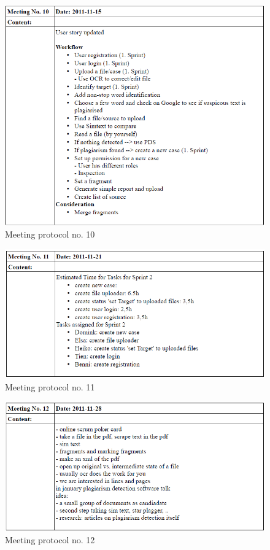 \begin{appendix}
\begin{figure}
  \centering
    \includegraphics[width=\textwidth]{images/a_meetings/meeting_10.png}
  \caption{Meeting protocol no. 10}
  \label{fig:meeting protocol no. 10}
\end{figure}

\begin{figure}
  \centering
    \includegraphics[width=\textwidth]{images/a_meetings/meeting_11.png}
  \caption{Meeting protocol no. 11}
  \label{fig:meeting protocol no. 11}
\end{figure}

\begin{figure}
  \centering
    \includegraphics[width=\textwidth]{images/a_meetings/meeting_12.png}
  \caption{Meeting protocol no. 12}
  \label{fig:meeting protocol no. 12}
\end{figure}


\end{appendix}
